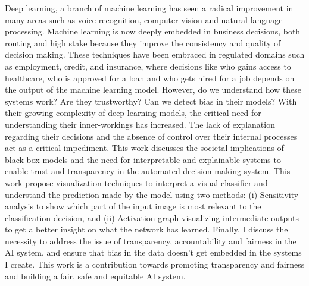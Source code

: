 %
%
%

\begin{publicabstract}

Deep learning, a branch of machine learning has seen a radical improvement in many areas such as voice recognition, computer vision and natural language processing. Machine learning is now deeply embedded in business decisions, both routing and high stake because they improve the consistency and quality of decision making. These techniques have been embraced in regulated domains such as employment, credit, and insurance, where decisions like who gains access to healthcare, who is approved for a loan and who gets hired for a job depends on the output of the machine learning model. However, do we understand how these systems work? Are they trustworthy? Can we detect bias in their models? With their growing complexity of deep learning models,  the critical need for understanding their inner-workings has increased. The lack of explanation regarding their decisions and the absence of control over their internal processes act as a critical impediment. This work discusses the societal implications of black box models and the need for interpretable and explainable systems to enable trust and transparency in the automated decision-making system. This work propose visualization techniques to interpret a visual classifier and understand the prediction made by the model using two methods: (i) Sensitivity analysis to  show which part of the  input image  is  most  relevant  to  the  classification decision, and (ii) Activation graph visualizing intermediate outputs to get a better insight on what the network has learned. Finally, I discuss the necessity to address the issue of transparency, accountability and fairness in the AI system, and ensure that bias in the data doesn't get embedded in the systems I create. This work is a contribution towards promoting transparency and fairness and building a fair, safe and equitable AI system.

\end{publicabstract}


